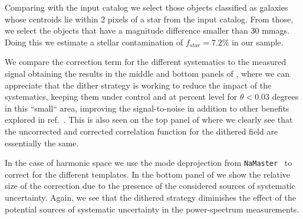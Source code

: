 \documentclass[\docopts]{\docclass}
\begin{document}
Comparing with the input catalog we select those objects classified as galaxies whose centroids lie within 2 pixels of a star from the input catalog. From those, we select the objects that have a magnitude difference smaller than 30 mmags. Doing this we estimate a stellar contamination of $f_{star}=7.2\%$ in our sample.

We compare the correction term for the different systematics to the measured signal obtaining the results in the middle and bottom panels of , where we can appreciate that the dither strategy is working to reduce the impact of the systematics, keeping them under control and at percent level for $\theta < 0.03$ degrees in this ``small`` area, improving the signal-to-noise in addition to other benefits explored in ref.~\citep{2016ApJ...829...50A}. This is also seen on the top panel of  where we clearly see that the uncorrected and corrected correlation function for the dithered field are essentially the same.



In the case of harmonic space we use the mode deprojection from \texttt{NaMaster}~\citep{Namaster} to correct for the different templates. In the bottom panel of  we show the relative size of the correction due to the presence of the considered sources of systematic uncertainty. Again, we see that the dithered strategy diminishes the effect of the potential sources of systematic uncertainty in the power-spectrum measurements.



\end{document}
